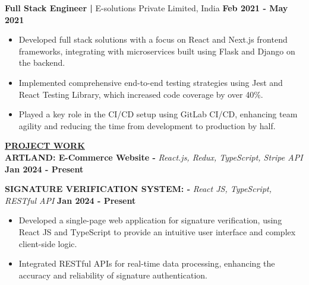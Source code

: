 \documentclass{article}
\begin{document}
\noindent \textbf{Full Stack Engineer | } E-solutions Private Limited, India  \hfill \textbf{Feb 2021 - May 2021}
\begin{itemize}[noitemsep,nolistsep,leftmargin=*]
\item {\small Developed full stack solutions with a focus on React and Next.js frontend frameworks, integrating with microservices built using Flask and Django on the backend.}
\item {\small Implemented comprehensive end-to-end testing strategies using Jest and React Testing Library, which increased code coverage by over 40\%.}
\item {\small Played a key role in the CI/CD setup using GitLab CI/CD, enhancing team agility and reducing the time from development to production by half.}\\
\end{itemize}



\noindent \textbf{\underline{}} 
\noindent \textbf{\underline{PROJECT WORK}} \\
\noindent \textbf{ARTLAND: E-Commerce Website -} \textit{React.js, Redux, TypeScript, Stripe API} \hfill \textbf{Jan 2024 - Present}

\noindent \textbf{SIGNATURE VERIFICATION SYSTEM: -} \textit{React JS, TypeScript, RESTful API} \hfill \textbf{Jan 2024 - Present}
\begin{itemize}[noitemsep,nolistsep,leftmargin=*]
\item {\small Developed a single-page web application for signature verification, using React JS and TypeScript to provide an intuitive user interface and complex client-side logic.}
\item {\small Integrated RESTful APIs for real-time data processing, enhancing the accuracy and reliability of signature authentication.}
\end{itemize}
\end{document}

